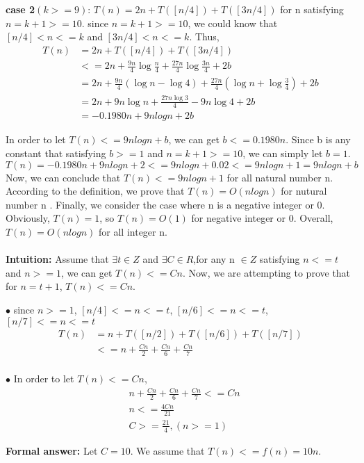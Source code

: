 \documentclass[12pt,a4paper]{article}
\newcommand{\question}[1]{\bigskip\noindent{\textbf{Q{#1} solution}}}
\begin{document}
		
		\textbf{case 2$(k>=9)$}:
		$T(n)=2n+T([n/4])+T([3n/4])$ for n satisfying $n=k+1>=10$. since $n=k+1>=10$, we could know that $[n/4]<n<=k$ and $[3n/4]<n<=k$. Thus, 
		\begin{align*}
 		T(n)&=2n+T([n/4])+T([3n/4]) \\
		&<=2n + \frac{9n}{4} \log{\frac{n}{4}} + \frac{27n}{4} \log{ \frac{3n}{4}}+2b\\
		&= 2n + \frac{9n}{4}(\log{n}-\log{4}) + \frac{27n}{4} ({ \log{n}+\log{\frac{3}{4}}})+2b\\
		&= 2n + 9n\log{n} + \frac{27n\log{3}}{4} - 9n\log{4} + 2b\\
		&= -0.1980n + 9nlogn + 2b
		\end{align*}

	
		In order to let $T(n)<=9nlogn + b$, we can get $b<=0.1980n$. Since b is any constant that satisfying $b>=1$ and $n=k+1>=10$, we can simply let $b=1$.
	$$ T(n)= -0.1980n+9nlogn+2 <= 9nlogn +0.02 <=9nlogn+1 =9nlogn + b$$
		Now, we can conclude that 	$T(n)<=9nlogn+1$ for all natural number n. According to the definition, we prove that $T(n)=O(nlogn)$ for nutural number n . Finally, we consider the case where n is a negative integer or 0. Obviously, $T(n)=1$, so $T(n)=O(1)$ for negative integer or 0. Overall, $T(n)=O(nlogn)$ for all integer n.\\\\


\question{3.B}
\textbf{Intuition:}
	{Assume that $\exists t \in Z$ and $\exists C \in R$,for any n $\in Z$ satisfying $n<=t$ and $n>=1$, we can get $T(n)<=Cn$. Now, we are attempting to prove that for $n=t+1$, $T(n)<=Cn$.}%

		$\bullet$ since $n>=1$, $[n/4]<=n<=t$, $[n/6]<=n<=t$, $[n/7]<=n<=t$
		\begin{align*}
 		T(n)&=n+T([n/2])+T([n/6])+T([n/7]) \\
		&<=n + \frac{Cn}{2}  + \frac{Cn}{6} + \frac{Cn}{7} \\
		\end{align*}


		$\bullet$ In order to let $T(n)<=Cn$,
		\begin{align*}
 		&n + \frac{Cn}{2}  + \frac{Cn}{6} + \frac{Cn}{7}<=Cn\\
		&n <=\frac{4Cn}{21}\\
		&C >=\frac{21}{4},(n>=1)
		\end{align*}
		
	\noindent
	\textbf{Formal answer:}
	{Let $C=10$.  We assume that $T(n)<=f(n)=10n$}.
\end{document}
